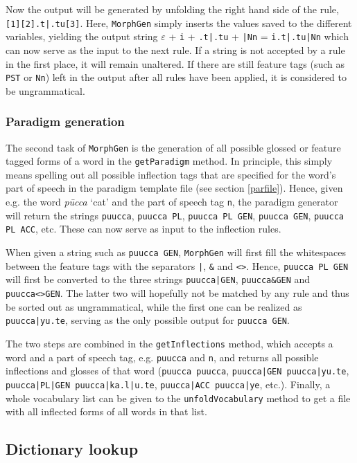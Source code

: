 \documentclass[a4paper]{article}
\newcommand{\typ}[1]{\texttt{#1}}
\begin{document}
Now the output will be generated by unfolding the right hand side of the rule, \typ{[1][2].t|.tu[3]}. Here, \typ{MorphGen} simply inserts the values saved to the different variables, yielding the output string $\varepsilon$ + \typ{i} + \typ{.t|.tu} + \typ{|Nn} = \typ{i.t|.tu|Nn} which can now serve as the input to the next rule. If a string is not accepted by a rule in the first place, it will remain unaltered. If there are still feature tags (such as \typ{PST} or \typ{Nn}) left in the output after all rules have been applied, it is considered to be ungrammatical.

\subsubsection{Paradigm generation}\label{pargen}

The second task of \typ{MorphGen} is the generation of all possible glossed or feature tagged forms of a word in the \typ{getParadigm} method. In principle, this simply means spelling out all possible inflection tags that are specified for the word's part of speech in the paradigm template file (see section \ref{parfile}). Hence, given e.g. the word \textit{pūcca} `cat' and the part of speech tag \typ{n}, the paradigm generator will return the strings \typ{puucca}, \typ{puucca PL}, \typ{puucca PL GEN}, \typ{puucca GEN}, \typ{puucca PL ACC}, etc. These can now serve as input to the inflection rules.

When given a string such as \typ{puucca GEN}, \typ{MorphGen} will first fill the whitespaces between the feature tags with the separators \typ{|}, \typ{\&} and \typ{<>}. Hence, \typ{puucca PL GEN} will first be converted to the three strings \typ{puucca|GEN}, \typ{puucca\&GEN} and \typ{puucca<>GEN}. The latter two will hopefully not be matched by any rule and thus be sorted out as ungrammatical, while the first one can be realized as \typ{puucca|yu.te}, serving as the only possible output for \typ{puucca GEN}.

The two steps are combined in the \typ{getInflections} method, which accepts a word and a part of speech tag, e.g. \typ{puucca} and \typ{n}, and returns all possible inflections and glosses of that word (\typ{puucca puucca}, \typ{puucca|GEN puucca|yu.te}, \typ{puucca|PL|GEN puucca|ka.l|u.te}, \typ{puucca|ACC puucca|ye}, etc.). Finally, a whole vocabulary list can be given to the \typ{unfoldVocabulary} method to get a file with all inflected forms of all words in that list.


\subsection{Dictionary lookup}
\end{document}
